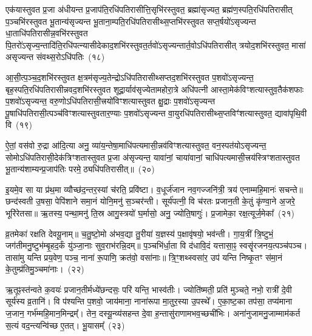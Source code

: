 एक॑यास्तुवत प्र॒जा अ॑धीयन्त प्र॒जा\-प॑ति॒रधि॑पतिरासीत्ति॒सृभि॑रस्तुवत॒ ब्रह्मा॑सृज्यत॒ ब्रह्म॑ण॒स्पति॒रधि॑पतिरासीत् प॒ञ्चभि॑रस्तुवत भू॒तान्य॑सृज्यन्त भू॒ताना॒म्पति॒रधि॑पतिरासीथ्स॒प्तभि॑रस्तुवत सप्त॒र्\mbox{}षयो॑\-ऽसृज्यन्त धा॒ताधि॑पतिरा\-सीन्न॒वभि॑रस्तुवत पि॒तरो॑\-ऽसृज्य॒न्तादि॑ति॒रधि॑पत्न्यासीदेकाद॒शभि॑रस्तुवत॒र्तवो॑\-ऽसृज्यन्तार्त॒वो\-ऽधि॑पतिरासीत् त्रयोद॒शभि॑रस्तुवत॒ मासा॑ असृज्यन्त संवथ्स॒रो\-ऽधि॑पतिः~(१८)

आ॒सी॒त्प॒ञ्च॒द॒शभि॑रस्तुवत क्ष॒त्रम॑सृज्य॒तेन्द्रो\-ऽधि॑पतिरासीथ्सप्तद॒शभि॑रस्तुवत प॒शवो॑\-ऽसृज्यन्त॒ बृह॒स्पति॒रधि॑पतिरासी\-न्नवद॒शभि॑रस्तुवत शूद्रा॒र्याव॑सृज्येतामहोरा॒त्रे अधि॑पत्नी आस्ता॒मेक॑विꣳशत्यास्तुव॒तैक॑शफाः प॒शवो॑\-ऽसृज्यन्त॒ वरु॒णो\-ऽधि॑पतिरासी॒त्त्रयो॑विꣳशत्यास्तुवत क्षु॒द्राः प॒शवो॑\-ऽसृज्यन्त पू॒षाधि॑पतिरासी॒त्पञ्च॑विꣳशत्यास्तुवतार॒ण्याः प॒शवो॑\-ऽसृज्यन्त वा॒युरधि॑पतिरासीथ्स॒प्तविꣳ॑शत्यास्तुवत॒ द्यावा॑पृथि॒वी वि~(१९)

ऐ॒तां॒ वस॑वो रु॒द्रा आ॑दि॒त्या अनु॒ व्या॑य॒न्तेषा॒माधि॑पत्यमासी॒न्नव॑विꣳशत्यास्तुवत॒ वन॒स्पत॑यो\-ऽसृज्यन्त॒ सोमो\-ऽ\-धि॑पतिरासी॒देक॑त्रिꣳशतास्तुवत प्र॒जा अ॑सृज्यन्त॒ यावा॑नां॒ चाया॑वानां॒ चाधि॑पत्यमासी॒त्त्रय॑स्त्रिꣳशतास्तुवत भू॒तान्य॑शाम्यन्प्र॒जा\-प॑तिः परमे॒ठ्यधि॑पतिरासीत्॥~(२०)

{\anuvakamend[{सं॒ व॒थ्स॒रो\-ऽधि॑पति॒र्वि पञ्च॑त्रिꣳशच्च}]}%

इ॒यमे॒व सा या प्र॑थ॒मा व्यौच्छ॑द॒न्तर॒स्यां च॑रति॒ प्रवि॑ष्टा। व॒धूर्ज॑जान नव॒गज्जनि॑त्री॒ त्रय॑ एनाम्महि॒मानः॑ सचन्ते॥ छन्द॑स्वती उ॒षसा॒ पेपि॑शाने समा॒नं योनि॒मनु॑ स॒ञ्चर॑न्ती। सूर्य॑पत्नी॒ वि च॑रतः प्रजान॒ती के॒तुं कृ॑ण्वा॒ने अ॒जरे॒ भूरि॑रेतसा॥ ऋ॒तस्य॒ पन्था॒मनु॑ ति॒स्र आगु॒स्त्रयो॑ घ॒र्मासो॒ अनु॒ ज्योति॒षागुः॑। प्र॒जामेका॒ रक्ष॒त्यूर्ज॒मेका᳚~(२१)

व्र॒तमेका॑ रक्षति देवयू॒नाम्॥ च॒तु॒ष्टो॒मो अ॑भव॒द्या तु॒रीया॑ य॒ज्ञस्य॑ प॒क्षावृ॑षयो॒ भव॑न्ती। गा॒य॒त्रीं त्रि॒ष्टुभं॒ जग॑तीमनु॒ष्टुभ॑म्बृ॒हद॒र्कं यु॑ञ्जा॒नाः सुव॒राभ॑रन्नि॒दम्॥ प॒ञ्चभि॑र्धा॒ता वि द॑धावि॒दं यत्तासा॒ꣴ॒ स्वसॄ॑रजनय॒त्पञ्च॑पञ्च। तासा॑मु यन्ति प्रय॒वेण॒ पञ्च॒ नाना॑ रू॒पाणि॒ क्रत॑वो॒ वसा॑नाः॥ त्रि॒ꣳ॒शथ्स्वसा॑र॒ उप॑ यन्ति निष्कृ॒तꣳ स॑मा॒नं के॒तुम्प्र॑तिमु॒ञ्चमा॑नाः।~(२२)

ऋ॒तूꣴस्त॑न्वते क॒वयः॑ प्रजान॒तीर्मध्ये॑छन्दसः॒ परि॑ यन्ति॒ भास्व॑तीः। ज्योति॑ष्मती॒ प्रति॑ मुञ्चते॒ नभो॒ रात्री॑ दे॒वी सूर्य॑स्य व्र॒तानि॑। वि प॑श्यन्ति प॒शवो॒ जाय॑माना॒ नाना॑रूपा मा॒तुर॒स्या उ॒पस्थे᳚। ए॒का॒ष्ट॒का तप॑सा॒ तप्य॑माना ज॒जान॒ गर्भ॑म्महि॒मान॒मिन्द्रम्᳚। तेन॒ दस्यू॒न्व्य॑सहन्त दे॒वा ह॒न्तासु॑राणामभव॒च्छची॑भिः। अना॑नुजामनु॒जाम्माम॑कर्त स॒त्यं वद॒न्त्यन्वि॑च्छ ए॒तत्। भू॒यासम्᳚~(२३)

